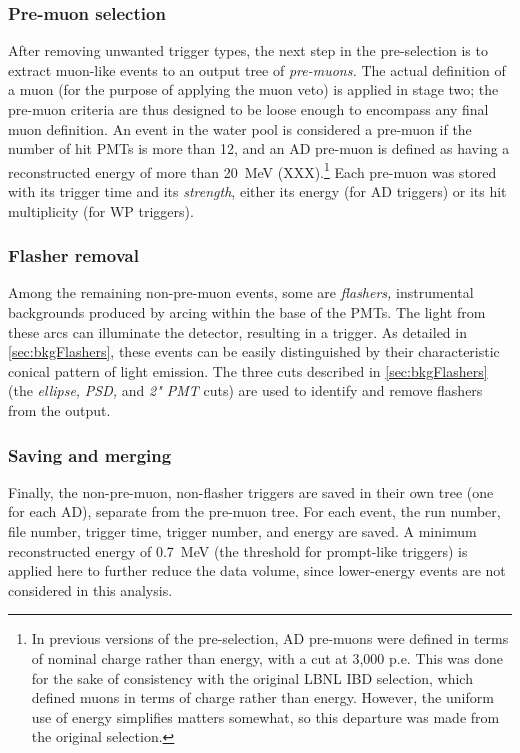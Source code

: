 \documentclass[../thesis.tex]{subfiles}
\begin{document}
\subsubsection{Pre-muon selection}
\label{sec:selPreMuons}

After removing unwanted trigger types, the next step in the pre-selection is to extract muon-like events to an output tree of \emph{pre-muons.} The actual definition of a muon (for the purpose of applying the muon veto) is applied in stage two; the pre-muon criteria are thus designed to be loose enough to encompass any final muon definition. An event in the water pool is considered a pre-muon if the number of hit PMTs is more than 12, and an AD pre-muon is defined as having a reconstructed energy of more than 20~MeV (XXX).\footnote{In previous versions of the pre-selection, AD pre-muons were defined in terms of nominal charge rather than energy, with a cut at 3,000 p.e. This was done for the sake of consistency with the original LBNL IBD selection, which defined muons in terms of charge rather than energy. However, the uniform use of energy simplifies matters somewhat, so this departure was made from the original selection.} Each pre-muon was stored with its trigger time and its \emph{strength}, either its energy (for AD triggers) or its hit multiplicity (for WP triggers).

\subsubsection{Flasher removal}
\label{sec:selFlashers}

Among the remaining non-pre-muon events, some are \emph{flashers,} instrumental backgrounds produced by arcing within the base of the PMTs. The light from these arcs can illuminate the detector, resulting in a trigger. As detailed in \autoref{sec:bkgFlashers}, these events can be easily distinguished by their characteristic conical pattern of light emission. The three cuts described in \autoref{sec:bkgFlashers} (the \emph{ellipse,} \emph{PSD,} and \emph{2" PMT} cuts) are used to identify and remove flashers from the output.

\subsubsection{Saving and merging}
\label{sec:selMergingOne}

Finally, the non-pre-muon, non-flasher triggers are saved in their own tree (one for each AD), separate from the pre-muon tree. For each event, the run number, file number, trigger time, trigger number, and energy are saved. A minimum reconstructed energy of 0.7~MeV (the threshold for prompt-like triggers) is applied here to further reduce the data volume, since lower-energy events are not considered in this analysis.
\end{document}

